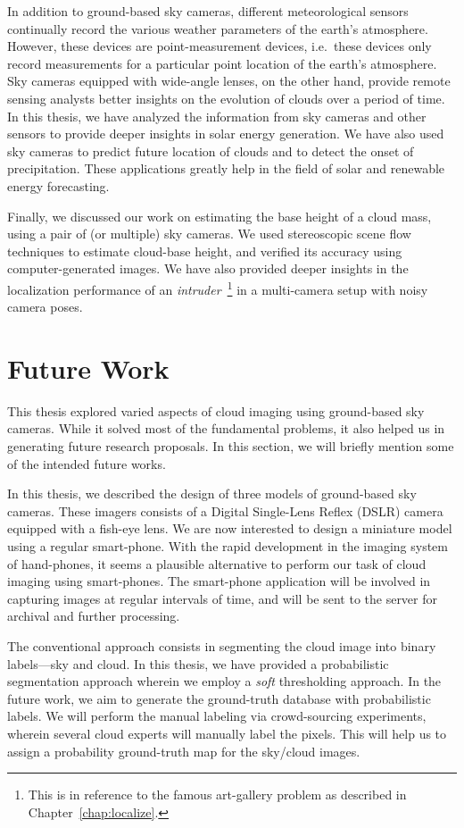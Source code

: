 In addition to ground-based sky cameras, different meteorological sensors continually record the various weather parameters of the earth's atmosphere. However, these devices are point-measurement devices, i.e.\ these devices only record measurements for a particular point location of the earth's atmosphere. Sky cameras equipped with wide-angle lenses, on the other hand, provide remote sensing analysts better insights on the evolution of clouds over a period of time. In this thesis, we have analyzed the information from sky cameras and other sensors to provide deeper insights in solar energy generation. We have also used sky cameras to predict future location of clouds and to detect the onset of precipitation. These applications greatly help in the field of solar and renewable energy forecasting. 

Finally, we discussed our work on estimating the base height of a cloud mass, using a pair of (or multiple) sky cameras. We used stereoscopic scene flow techniques to estimate cloud-base height, and verified its accuracy using computer-generated images. We have also provided deeper insights in the localization performance of an \emph{intruder}~\footnote{This is in reference to the famous art-gallery problem as described in Chapter~\ref{chap:localize}.} in a multi-camera setup with noisy camera poses. 


\section{Future Work}
This thesis explored varied aspects of cloud imaging using ground-based sky cameras. While it solved most of the fundamental problems, it also helped us in generating future research proposals. In this section, we will briefly mention some of the intended future works.

In this thesis, we described the design of three models of ground-based sky cameras. These imagers consists of a Digital Single-Lens Reflex (DSLR) camera equipped with a fish-eye lens. We are now interested to design a miniature model using a regular smart-phone. With the rapid development in the imaging system of hand-phones, it seems a plausible alternative to perform our task of cloud imaging using smart-phones. The smart-phone application will be involved in capturing images at regular intervals of time, and will be sent to the server for archival and further processing. 

The conventional approach consists in segmenting the cloud image into binary labels---sky and cloud. In this thesis, we have provided a probabilistic segmentation approach wherein we employ a \emph{soft} thresholding approach. In the future work, we aim to generate the ground-truth database with probabilistic labels. We will perform the manual labeling via crowd-sourcing experiments, wherein several cloud experts will manually label the pixels. This will help us to assign a probability ground-truth map for the sky/cloud images. 

